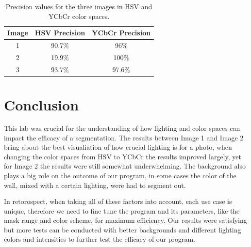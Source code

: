 \documentclass[journal]{IEEEtran}
\begin{document}
\begin{table}[!htbp]
    \centering
    \begin{tabular}{|c|c|c|}
        \hline
        \textbf{Image} & \textbf{HSV Precision} & \textbf{YCbCr Precision} \\
        \hline
        1 & 90.7\% & 96\% \\
        \hline
        2 & 19.9\% & 100\% \\
        \hline
        3 & 93.7\% & 97.6\% \\
        \hline
    \end{tabular}
    \caption{Precision values for the three images in HSV and YCbCr color spaces.}
    \label{tab:precision}
\end{table}

\section{Conclusion}
 
This lab was crucial for the understanding of how lighting and color spaces can impact the efficacy of a segmentation.
The results between Image 1 and Image 2 bring about the best visualiation of how crucial lighting is for a photo, when changing the color spaces from HSV to YCbCr the results improved largely, yet for Image 2 the results were still somewhat underwhelming.
The background also plays a big role on the outcome of our program, in some cases the color of the wall, mixed with a certain lighting, were had to segment out.

In retorospect, when taking all of these factors into account, each use case is unique, therefore we need to fine tune the program and its parameters, like the mask range and color scheme,  for maximum efficiency.
Our results were satisfying but more tests can be conducted with better backgrounds and different lighting colors and intensities to further test the efficacy of our program.


% 
\end{document}
